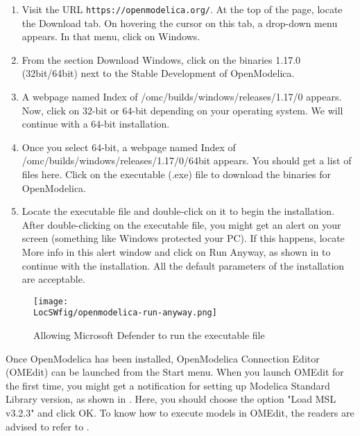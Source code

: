 \begin{enumerate}
      \item Visit the URL {\tt https://openmodelica.org/}.  At the top of the page, locate the Download tab. On hovering the cursor on this tab, a drop-down menu appears. In that menu, click on Windows. 
      \item From the section Download Windows, click on the binaries 1.17.0 (32bit/64bit) next to the Stable Development of OpenModelica. 
      \item A webpage named Index of /omc/builds/windows/releases/1.17/0 appears. Now, click on 32-bit or 64-bit depending on your operating system. We will continue with a 64-bit installation. 
      \item Once you select 64-bit, a webpage named Index of /omc/builds/windows/releases/1.17/0/64bit appears. You should get a list of files here. Click on the executable (.exe) file to download the binaries for OpenModelica.
      \item Locate the executable file and double-click on it to begin the 
      installation. After double-clicking on the executable file, 
      you might get an alert on your screen (something like Windows protected your PC). 
      If this happens, locate More info in this alert window and click on 
      Run Anyway, as shown in  to continue with the 
      installation. All the default parameters of the installation are acceptable. 
\end{enumerate}

\begin{figure}
      \centering
      \texttt{[image: \\LocSWfig/openmodelica-run-anyway.png]}
      \caption{Allowing Microsoft Defender to run the executable file}
      \label{om-run-anyway}
\end{figure}

Once OpenModelica has been installed, OpenModelica Connection Editor (OMEdit) 
can be launched from the Start menu.  When you 
launch OMEdit for the first time, you might get a notification for setting up 
Modelica Standard Library version, as shown in . Here, you 
should choose the option "Load MSL v3.2.3" and click OK.  To know how to execute models 
in OMEdit, the readers are advised to refer to . 


